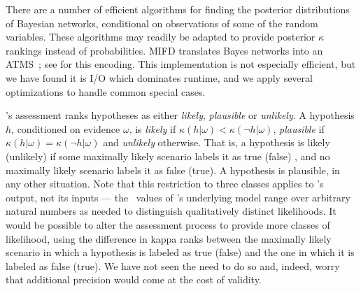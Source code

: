 There are a number of efficient algorithms for finding the posterior distributions of Bayesian networks, 
conditional on observations of some of the random variables. These algorithms may readily be adapted to 
provide posterior $\kappa$ rankings instead of probabilities.
MIFD translates Bayes networks into an
ATMS~\cite{Forbus+DeKleer:1993}; see
\cite{Charniak:88,Poole:93,provan-ijcai89,goldman:09Scyllarus}
%
for this encoding.
This implementation is not especially efficient, but we have found
it is I/O which dominates runtime, and we apply several optimizations to
handle common special cases.
%

\mifd's assessment ranks hypotheses as either
\emph{likely}, \emph{plausible} or \emph{unlikely}. A hypothesis $h$,
conditioned on evidence $\omega$,
is \emph{likely} if
$\kappa(h|\omega) < \kappa(\neg h|\omega)$, \emph{plausible} if $\kappa(h|\omega) = \kappa(\neg h|\omega)$
and \emph{unlikely} otherwise.
That is, a hypothesis is likely (unlikely) if some maximally likely scenario labels it as
true (false) , and no maximally likely scenario labels it as false (true).  A
hypothesis is plausible, in any other situation.
Note that this restriction to three classes applies to \mifd's output,
not its inputs --- the \tkappa\ values of \mifd's underlying model
range over arbitrary natural numbers as needed to distinguish
qualitatively distinct likelihoods.
It would be possible to alter the assessment process to provide more classes of
likelihood, using the difference in kappa ranks between the maximally likely
scenario in which a hypothesis is labeled as true (false) and the one in which
it is labeled as false (true).  We have not seen the need to do so and, indeed,
worry that additional precision would come at the cost of validity.

